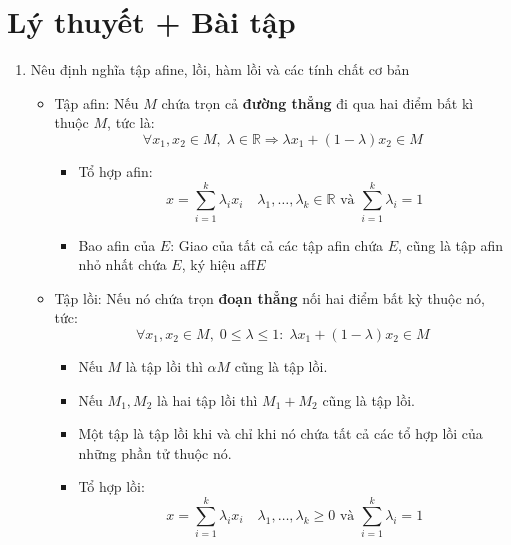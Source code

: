 \documentclass[12pt]{article}
\begin{document}
\section{Lý thuyết + Bài tập}
\begin{enumerate}
	\item Nêu định nghĩa tập afine, lồi, hàm lồi và các tính chất cơ bản
	\begin{itemize}
		\item Tập afin: Nếu $M$ chứa trọn cả \textbf{đường thẳng} đi qua hai điểm bất kì thuộc $M$, tức là:
		$$
			\forall x_1, x_2 \in M, \; \lambda \in \mathbb{R} \Rightarrow \lambda x_1 + (1-\lambda)x_2 \in M
		$$
		\begin{itemize}
			\item Tổ hợp afin:
			$$
				x = \sum_{i=1}^k \lambda_i x_i \quad \lambda_1,\dots,\lambda_k \in \mathbb{R} \text{ và } \sum_{i=1}^k \lambda_i = 1
			$$
			\item Bao afin của $E$: Giao của tất cả các tập afin chứa $E$, cũng là tập afin nhỏ nhất chứa $E$, ký hiệu aff$E$
		\end{itemize}				
		
		\item Tập lồi: Nếu nó chứa trọn \textbf{đoạn thẳng} nối hai điểm bất kỳ thuộc nó, tức:
		$$
			\forall x_1, x_2 \in M, \; 0 \leq \lambda  \leq 1: \; \lambda x_1 + (1-\lambda)x_2 \in M
		$$
		\begin{itemize}
			\item Nếu $M$ là tập lồi thì $\alpha M$ cũng là tập lồi.
			\item Nếu $M_1, M_2$ là hai tập lồi thì $M_1 + M_2$ cũng là tập lồi.
			\item Một tập là tập lồi khi và chỉ khi nó chứa tất cả các tổ hợp lồi của những phần tử thuộc nó.
			\item Tổ hợp lồi:
			$$
				x = \sum_{i=1}^k \lambda_i x_i \quad \lambda_1,\dots,\lambda_k \geq 0 \text{ và } \sum_{i=1}^k \lambda_i = 1
			$$
		\end{itemize}				
		

\end{itemize}
\end{enumerate}
\end{document}
